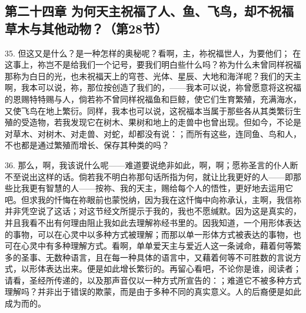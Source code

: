 
\subsection{第二十四章 为何天主祝福了人、鱼、飞鸟，却不祝福草木与其他动物？（第28节）}

35. 但这又是什么？是一种怎样的奥秘呢？看啊，主，祢祝福世人，为要他们； 在这事上，祢岂不是给我们一个记号，要我们明白些什么吗？祢为什么未曾同样祝福那称为白日的光，也未祝福天上的穹苍、光体、星辰、大地和海洋呢？我们的天主啊，我本可以说，祢，那位按创造了我们的，——我本可以说，祢曾愿意将这祝福的恩赐特特赐与人，倘若祢不曾同样祝福鱼和巨鲸，使它们生育繁殖，充满海水，又使飞鸟在地上繁衍。同样，我本也可以说，这祝福本当属于那些各从其类繁衍生殖的受造物，若我发现它在树木、果树和地上的走兽中也曾出现。但如今，不论是对草木、对树木、对走兽、对蛇，却都没有说：；而所有这些，连同鱼、鸟和人，不也都是通过繁殖而增长、保存其种类的吗？\par

36. 那么，啊，我该说什么呢——难道要说绝非如此，啊，啊；愿祢圣言的仆人断不至说出这样的话。倘若我不明白祢那句话所指为何，就让比我更好的人——即那些比我更有智慧的人——按祢、我的天主，赐给每个人的悟性，更好地去运用它吧。但求我的忏悔在祢眼前也蒙悦纳，因为我在这忏悔中向祢承认，主啊，我信祢并非凭空说了这话；对这节经文所提示于我的，我也不愿缄默。因为这是真实的，并且我看不出有何理由阻止我如此去理解祢经书里的。因我知道，一个用形体表达的事物，可以在心灵中以多种方式被理解；而那以单一形体方式被表达的事物，也可在心灵中有多种理解方式。看啊，单单爱天主与爱近人这一条诫命，藉着何等繁多的圣事、无数种语言，且在每一种具体的语言中，又藉着何等不可胜数的言说方式，以形体表达出来。便是如此增长繁衍的。再留心看吧，不论你是谁，阅读者；请看，圣经所传递的，以及那声音仅以一种方式所宣告的：；难道它不被多种方式理解吗？并非出于错误的欺蒙，而是由于多种不同的真实意义。人的后裔便是如此成为而的。\par

